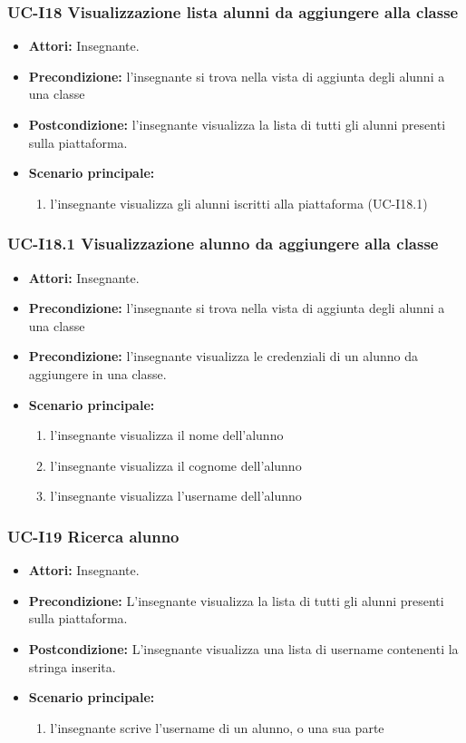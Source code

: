 \subsubsection{UC-I18 Visualizzazione lista alunni da aggiungere alla classe}
\begin{itemize}
	\item \textbf{Attori:} Insegnante.
	\item \textbf{Precondizione:} l'insegnante si trova nella vista di aggiunta degli alunni a una classe
	\item \textbf{Postcondizione:} l'insegnante visualizza la lista di tutti gli alunni presenti sulla piattaforma.
	\item \textbf{Scenario principale:}
	\begin{enumerate}
		\item l'insegnante visualizza gli alunni iscritti alla piattaforma (UC-I18.1)
	\end{enumerate}
\end{itemize}

\subsubsection{UC-I18.1 Visualizzazione alunno da aggiungere alla classe}
\begin{itemize}
	\item \textbf{Attori:} Insegnante.
	\item \textbf{Precondizione:} l'insegnante si trova nella vista di aggiunta degli alunni a una classe
	\item \textbf{Precondizione:} l'insegnante visualizza le credenziali di un alunno da aggiungere in una classe.
	\item \textbf{Scenario principale:}
	\begin{enumerate}
		\item l'insegnante visualizza il nome dell'alunno
		\item l'insegnante visualizza il cognome dell'alunno
		\item l'insegnante visualizza l'username dell'alunno
	\end{enumerate}
\end{itemize}

\subsubsection{UC-I19 Ricerca alunno}
\begin{itemize}
	\item \textbf{Attori:} Insegnante.
	\item \textbf{Precondizione:} L'insegnante visualizza la lista di tutti gli alunni presenti sulla piattaforma.
	\item \textbf{Postcondizione:} L'insegnante visualizza una lista di username contenenti la stringa inserita.
	\item \textbf{Scenario principale:}
	\begin{enumerate}
		\item l'insegnante scrive l'username di un alunno, o una sua parte
	\end{enumerate}
\end{itemize}

